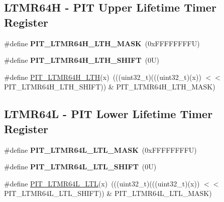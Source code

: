 \subsection*{L\+T\+M\+R64H -\/ P\+IT Upper Lifetime Timer Register}
\begin{DoxyCompactItemize}
\item 
\mbox{\label{group___p_i_t___register___masks_ga2f52ce484f53348d406fae4b3cac7fdf}} 
\#define {\bfseries P\+I\+T\+\_\+\+L\+T\+M\+R64\+H\+\_\+\+L\+T\+H\+\_\+\+M\+A\+SK}~(0x\+F\+F\+F\+F\+F\+F\+F\+F\+U)
\item 
\mbox{\label{group___p_i_t___register___masks_gaf355862db7eafd261031477364a6ef8d}} 
\#define {\bfseries P\+I\+T\+\_\+\+L\+T\+M\+R64\+H\+\_\+\+L\+T\+H\+\_\+\+S\+H\+I\+FT}~(0\+U)
\item 
\#define \mbox{\hyperlink{group___p_i_t___register___masks_gad3b13100c85d855043c5f19494f33c2d}{P\+I\+T\+\_\+\+L\+T\+M\+R64\+H\+\_\+\+L\+TH}}(x)~(((uint32\+\_\+t)(((uint32\+\_\+t)(x)) $<$$<$ P\+I\+T\+\_\+\+L\+T\+M\+R64\+H\+\_\+\+L\+T\+H\+\_\+\+S\+H\+I\+FT)) \& P\+I\+T\+\_\+\+L\+T\+M\+R64\+H\+\_\+\+L\+T\+H\+\_\+\+M\+A\+SK)
\end{DoxyCompactItemize}
\subsection*{L\+T\+M\+R64L -\/ P\+IT Lower Lifetime Timer Register}
\begin{DoxyCompactItemize}
\item 
\mbox{\label{group___p_i_t___register___masks_gab7337206a85c605ed0ea16b77df99e1a}} 
\#define {\bfseries P\+I\+T\+\_\+\+L\+T\+M\+R64\+L\+\_\+\+L\+T\+L\+\_\+\+M\+A\+SK}~(0x\+F\+F\+F\+F\+F\+F\+F\+F\+U)
\item 
\mbox{\label{group___p_i_t___register___masks_ga773e29842f6f049c17bf141d4cc4fc87}} 
\#define {\bfseries P\+I\+T\+\_\+\+L\+T\+M\+R64\+L\+\_\+\+L\+T\+L\+\_\+\+S\+H\+I\+FT}~(0\+U)
\item 
\#define \mbox{\hyperlink{group___p_i_t___register___masks_ga42ab7207419fd5b7721cd01ea1d08a79}{P\+I\+T\+\_\+\+L\+T\+M\+R64\+L\+\_\+\+L\+TL}}(x)~(((uint32\+\_\+t)(((uint32\+\_\+t)(x)) $<$$<$ P\+I\+T\+\_\+\+L\+T\+M\+R64\+L\+\_\+\+L\+T\+L\+\_\+\+S\+H\+I\+FT)) \& P\+I\+T\+\_\+\+L\+T\+M\+R64\+L\+\_\+\+L\+T\+L\+\_\+\+M\+A\+SK)
\end{DoxyCompactItemize}
